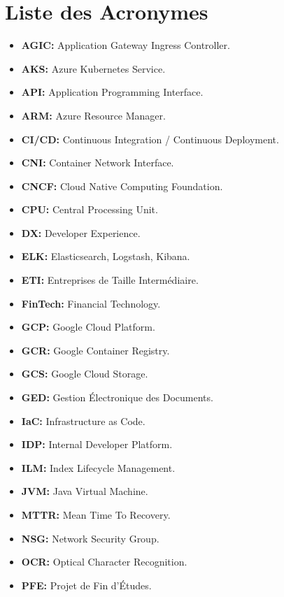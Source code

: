 \chapter*{Liste des Acronymes}

\vspace{1cm}
\begin{itemize}
    \item \textbf{AGIC:} Application Gateway Ingress Controller.
    \item \textbf{AKS:} Azure Kubernetes Service.
    \item \textbf{API:} Application Programming Interface.
    \item \textbf{ARM:} Azure Resource Manager.
    \item \textbf{CI/CD:} Continuous Integration / Continuous Deployment.
    \item \textbf{CNI:} Container Network Interface.
    \item \textbf{CNCF:} Cloud Native Computing Foundation.
    \item \textbf{CPU:} Central Processing Unit.
    \item \textbf{DX:} Developer Experience.
    \item \textbf{ELK:} Elasticsearch, Logstash, Kibana.
    \item \textbf{ETI:} Entreprises de Taille Intermédiaire.
    \item \textbf{FinTech:} Financial Technology.
    \item \textbf{GCP:} Google Cloud Platform.
    \item \textbf{GCR:} Google Container Registry.
    \item \textbf{GCS:} Google Cloud Storage.
    \item \textbf{GED:} Gestion Électronique des Documents.
    \item \textbf{IaC:} Infrastructure as Code.
    \item \textbf{IDP:} Internal Developer Platform.
    \item \textbf{ILM:} Index Lifecycle Management.
    \item \textbf{JVM:} Java Virtual Machine.
    \item \textbf{MTTR:} Mean Time To Recovery.
    \item \textbf{NSG:} Network Security Group.
    \item \textbf{OCR:} Optical Character Recognition.
    \item \textbf{PFE:} Projet de Fin d'Études.

\end{itemize}
